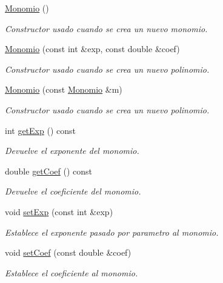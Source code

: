 \begin{DoxyCompactItemize}
\item 
\hyperlink{classed_1_1Monomio_ac4d5082a7918cd436090855a729337d9}{Monomio} ()
\begin{DoxyCompactList}\small\item\em Constructor usado cuando se crea un nuevo monomio. \end{DoxyCompactList}\item 
\hyperlink{classed_1_1Monomio_a2c3fdd06374813306e45f2b81af4c64e}{Monomio} (const int \&exp, const double \&coef)
\begin{DoxyCompactList}\small\item\em Constructor usado cuando se crea un nuevo polinomio. \end{DoxyCompactList}\item 
\hyperlink{classed_1_1Monomio_a1a40fcd30108ec98eaec208150455337}{Monomio} (const \hyperlink{classed_1_1Monomio}{Monomio} \&m)
\begin{DoxyCompactList}\small\item\em Constructor usado cuando se crea un nuevo polinomio. \end{DoxyCompactList}\item 
int \hyperlink{classed_1_1Monomio_aac34c36d80ca652b93d9aee5e230a466}{get\+Exp} () const 
\begin{DoxyCompactList}\small\item\em Devuelve el exponente del monomio. \end{DoxyCompactList}\item 
double \hyperlink{classed_1_1Monomio_a854e70095390390529cb8dc9e452b8b7}{get\+Coef} () const 
\begin{DoxyCompactList}\small\item\em Devuelve el coeficiente del monomio. \end{DoxyCompactList}\item 
void \hyperlink{classed_1_1Monomio_a1bd02f016ac38b1ffaadf4955f91264b}{set\+Exp} (const int \&exp)
\begin{DoxyCompactList}\small\item\em Establece el exponente pasado por parametro al monomio. \end{DoxyCompactList}\item 
void \hyperlink{classed_1_1Monomio_aace55ae66423fd9cc0dfcfbf302db635}{set\+Coef} (const double \&coef)
\begin{DoxyCompactList}\small\item\em Establece el coeficiente al monomio. \end{DoxyCompactList}\item 

\end{DoxyCompactItemize}
